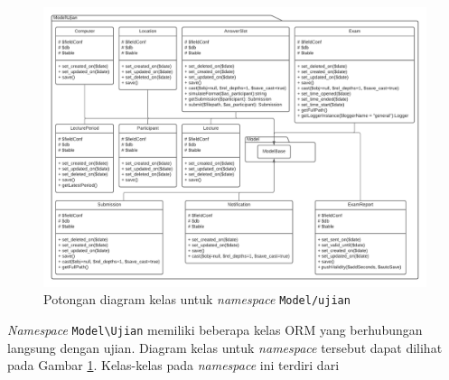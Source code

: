     
    \begin{figure}
        \centering
        \includegraphics[width=0.8\paperheight]{Gambar/classmap-be/Classmap - app-model-ujian.pdf}
        \caption{Potongan diagram kelas untuk \textit{namespace}
        \texttt{Model/ujian}}
        \label{fig:classmap_app-model-ujian}
    \end{figure}
    \textit{Namespace} \texttt{Model\textbackslash Ujian} memiliki beberapa kelas ORM yang
    berhubungan langsung dengan ujian. Diagram kelas untuk \textit{namespace}
    tersebut dapat dilihat pada Gambar \ref{fig:classmap_app-model-ujian}.
    Kelas-kelas pada \textit{namespace} ini terdiri dari
